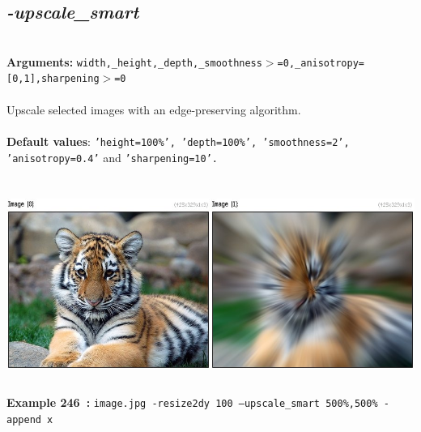 \documentclass[a4paper,11pt,twoside]{book}
\begin{document}
\subsection{\emph{-upscale\_smart} }\vspace*{-0.5em}
~\\\textbf{Arguments: } 
{\small \texttt{width,\_height,\_depth,\_smoothness$>$=0,\_anisotropy=[0,1],sharpening$>$=0}}\\~\\
Upscale selected images with an edge-preserving algorithm.
~\\~\\\textbf{Default values}: {\small \texttt{'height=100\%', 'depth=100\%', 'smoothness=2', 'anisotropy=0.4'} and \texttt{'sharpening=10'.}}
\begin{center}\includegraphics[keepaspectratio=true,height=7cm,width=\textwidth]{img/gmic_def246.jpg}\\
{\footnotesize \textbf{Example 246~:} \texttt{image.jpg -resize2dy 100 --upscale\_smart 500\%,500\% -append x}}
\end{center}
\end{document}
